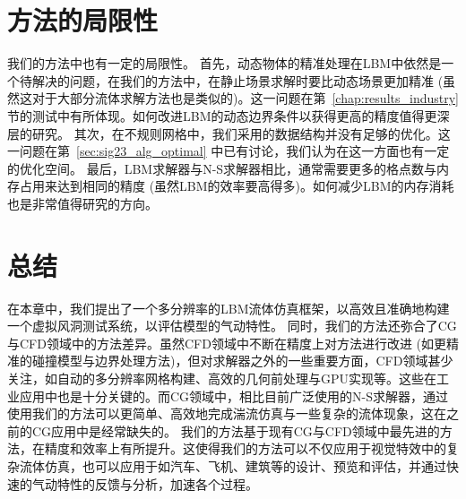 \section{方法的局限性}
我们的方法中也有一定的局限性。
首先，动态物体的精准处理在LBM中依然是一个待解决的问题，在我们的方法中，在静止场景求解时要比动态场景更加精准 (虽然这对于大部分流体求解方法也是类似的)。这一问题在第~\ref{chap:results_industry} 节的测试中有所体现。如何改进LBM的动态边界条件以获得更高的精度值得更深层的研究。
其次，在不规则网格中，我们采用的数据结构并没有足够的优化。这一问题在第~\ref{sec:sig23_alg_optimal} 中已有讨论，我们认为在这一方面也有一定的优化空间。
最后，LBM求解器与N-S求解器相比，通常需要更多的格点数与内存占用来达到相同的精度 (虽然LBM的效率要高得多)。如何减少LBM的内存消耗也是非常值得研究的方向。

\section{总结}
在本章中，我们提出了一个多分辨率的LBM流体仿真框架，以高效且准确地构建一个虚拟风洞测试系统，以评估模型的气动特性。
同时，我们的方法还弥合了CG与CFD领域中的方法差异。虽然CFD领域中不断在精度上对方法进行改进 (如更精准的碰撞模型与边界处理方法)，但对求解器之外的一些重要方面，CFD领域甚少关注，如自动的多分辨率网格构建、高效的几何前处理与GPU实现等。这些在工业应用中也是十分关键的。而CG领域中，相比目前广泛使用的N-S求解器，通过使用我们的方法可以更简单、高效地完成湍流仿真与一些复杂的流体现象，这在之前的CG应用中是经常缺失的。
我们的方法基于现有CG与CFD领域中最先进的方法，在精度和效率上有所提升。这使得我们的方法可以不仅应用于视觉特效中的复杂流体仿真，也可以应用于如汽车、飞机、建筑等的设计、预览和评估，并通过快速的气动特性的反馈与分析，加速各个过程。

